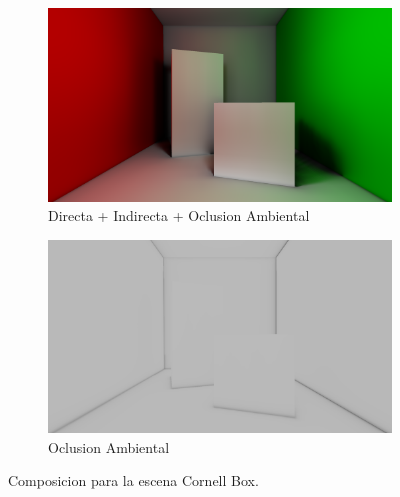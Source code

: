 \begin{figure}[H]
\begin{subfigure}[t]{.49\linewidth}
	\end{subfigure}%
	\par\bigskip
	\begin{subfigure}[t]{.49\linewidth}
		\centering
		\caption*{Directa + Indirecta + Oclusion Ambiental}
		\captionsetup{justification=centering}
		\includegraphics[width=\linewidth]{media/finals/cornell_gi.png}
	\end{subfigure}%
	\hspace{0.01\textwidth}
	\begin{subfigure}[t]{.49\linewidth}
		\centering
		\caption*{Oclusion Ambiental}
		\captionsetup{justification=centering}
		\includegraphics[width=\linewidth]{media/finals/cornell_ao.png}
	\end{subfigure}%
	\caption{Composicion para la escena Cornell Box.}
	\label{fig:cornell_final}
\end{figure}

